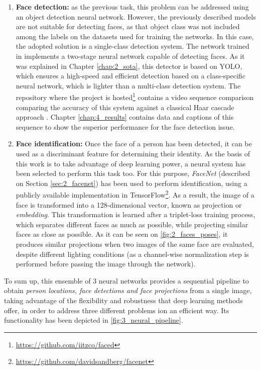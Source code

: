 \begin{enumerate}
	\item \textbf{Face detection:} as the previous task, this problem can be addressed using an object detection neural network. However, the previously described models are not suitable for detecting faces, as that object class was not included among the labels on the datasets used for training the networks. In this case, the adopted solution is a single-class detection system. The network trained in \cite{faced} implements a two-stage neural network capable of detecting faces. As it was explained in Chapter \ref{chap:2_sota}, this detector is based on YOLO, which ensures a high-speed and efficient detection based on a class-specific neural network, which is lighter than a multi-class detection system. The repository where the project is hosted\footnote{\url{https://github.com/iitzco/faced}} contains a video sequence comparison comparing the accuracy of this system against a classical Haar cascade approach \cite{violajones}.  Chapter \ref{chap:4_results} contains data and captions of this sequence to show the superior performance for the face detection issue.
	
	\item \textbf{Face identification:} Once the face of a person has been detected, it can be used as a discriminant feature for determining their identity. As the basis of this work is to take advantage of deep learning power, a neural system has been selected to perform this task too. For this purpose, \textit{FaceNet} (described on Section \ref{sec:2_facenet}) has been used to perform identification, using a publicly available implementation in TensorFlow\footnote{\url{https://github.com/davidsandberg/facenet}}. As a result, the image of a face is transformed into a 128-dimensional vector, known as projection or \textit{embedding}. This transformation is learned after a triplet-loss training process, which separates different faces as much as possible, while projecting similar faces as close as possible. As it can be seen on \autoref{fig:2_faces_poses}, it produces similar projections when two images of the same face are evaluated, despite different lighting conditions (as a channel-wise normalization step is performed before passing the image through the network).
	
\end{enumerate}

To sum up, this ensemble of 3 neural networks provides a sequential pipeline to obtain \textit{person locations, face detections and face projections} from a single image, taking advantage of the flexibility and robustness that deep learning methods offer, in order to address three different problems ion an efficient way. Its functionality has been depicted in \autoref{fig:3_neural_pipeline}.\\


